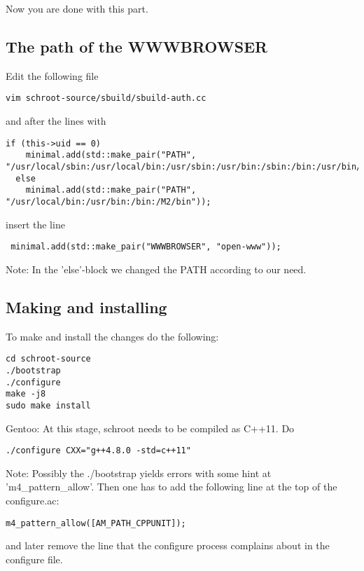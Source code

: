 \documentclass[a4paper]{book}
\begin{document}
Now you are done with this part.

\subsection{The path of the WWWBROWSER}
Edit the following file

\begin{verbatim}
vim schroot-source/sbuild/sbuild-auth.cc
\end{verbatim}
and after the lines with

\begin{verbatim}
if (this->uid == 0)
    minimal.add(std::make_pair("PATH", "/usr/local/sbin:/usr/local/bin:/usr/sbin:/usr/bin:/sbin:/bin:/usr/bin/X11"));
  else
    minimal.add(std::make_pair("PATH", "/usr/local/bin:/usr/bin:/bin:/M2/bin"));
\end{verbatim}
insert the line

\begin{verbatim}
 minimal.add(std::make_pair("WWWBROWSER", "open-www"));
\end{verbatim}

Note: In the 'else'-block we changed the PATH according to our need.

\subsection{Making and installing}
To make and install the changes do the following:
\begin{verbatim}
cd schroot-source
./bootstrap
./configure
make -j8
sudo make install
\end{verbatim}

Gentoo: At this stage, schroot needs to be compiled as C++11. Do
\begin{verbatim}
./configure CXX="g++4.8.0 -std=c++11"
\end{verbatim}

Note: Possibly the ./bootstrap yields errors with some hint at 'm4\_pattern\_allow'. Then one has to add the following line at the top of the configure.ac:
\begin{verbatim}
m4_pattern_allow([AM_PATH_CPPUNIT]);
\end{verbatim}
and later remove the line that the configure process complains about in the configure file.
\end{document}
